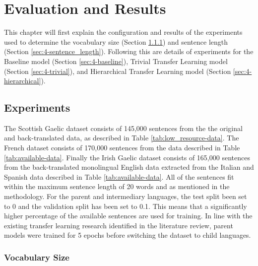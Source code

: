 
\chapter{Evaluation and Results}
This chapter will first explain the configuration and results of the experiments used to determine the vocabulary size (Section \ref{sec:4-vocab_size}) and sentence length (Section \ref{sec:4-sentence_length}). Following this are details of experiments for the Baseline model (Section \ref{sec:4-baseline}), Trivial Transfer Learning model (Section \ref{sec:4-trivial}), and Hierarchical Transfer Learning model (Section \ref{sec:4-hierarchical}).
\newpage

\section{Experiments}

The Scottish Gaelic dataset consists of 145,000 sentences from the the original and back-translated data, as described in Table \ref{tab:low_resource-data}. The French dataset consists of 170,000 sentences from the data described in Table \ref{tab:available-data}. Finally the Irish Gaelic dataset consists of 165,000 sentences from the back-translated monolingual English data extracted from the Italian and Spanish data described in Table \ref{tab:available-data}.
All of the sentences fit within the maximum sentence length of 20 words and as mentioned in the methodology.
For the parent and intermediary languages, the test split been set to 0 and the validation split has been set to 0.1. This means that a significantly higher percentage of the available sentences are used for training. In line with the existing transfer learning research identified in the literature review, parent models were trained for 5 epochs before switching the dataset to child languages.


\subsection{Vocabulary Size}
\label{sec:4-vocab_size}

